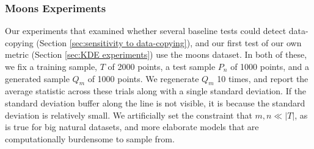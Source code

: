 \subsubsection{Moons Experiments}
\label{sec:appendix moons experiments}
Our experiments that examined whether several baseline tests could detect data-copying (Section \ref{sec:sensitivity to data-copying}), and our first test of our own metric (Section \ref{sec:KDE experiments}) use the moons dataset. In both of these, we fix a training sample, $T$ of 2000 points, a test sample $P_n$ of 1000 points, and a generated sample $Q_m$ of 1000 points. We regenerate $Q_m$ 10 times, and report the average statistic across these trials along with a single standard deviation. If the standard deviation buffer along the line is not visible, it is because the standard deviation is relatively small. We artificially set the constraint that $m,n \ll |T|$, as is true for big natural datasets, and more elaborate models that are computationally burdensome to sample from. 

